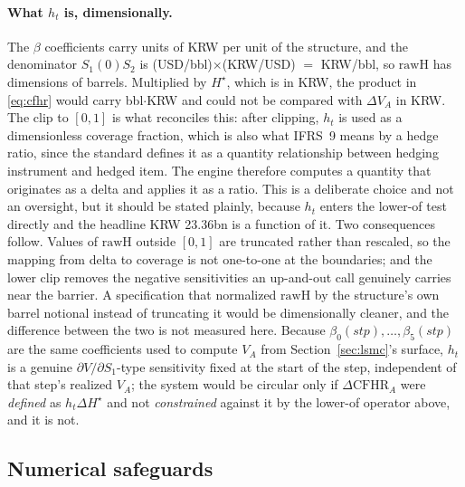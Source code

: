 \documentclass[11pt,a4paper]{article}
\begin{document}
\paragraph{What $h_t$ is, dimensionally.} The $\beta$ coefficients carry units of KRW per unit of the structure, and the denominator $S_1(0)S_2$ is (USD/bbl)$\times$(KRW/USD) $=$ KRW/bbl, so $\mathrm{rawH}$ has dimensions of barrels. Multiplied by $H^\star$, which is in KRW, the product in \eqref{eq:cfhr} would carry bbl$\cdot$KRW and could not be compared with $\Delta V_A$ in KRW. The clip to $[0,1]$ is what reconciles this: after clipping, $h_t$ is used as a dimensionless coverage fraction, which is also what IFRS~9 means by a hedge ratio, since the standard defines it as a quantity relationship between hedging instrument and hedged item. The engine therefore computes a quantity that originates as a delta and applies it as a ratio. This is a deliberate choice and not an oversight, but it should be stated plainly, because $h_t$ enters the lower-of test directly and the headline KRW 23.36bn is a function of it. Two consequences follow. Values of $\mathrm{rawH}$ outside $[0,1]$ are truncated rather than rescaled, so the mapping from delta to coverage is not one-to-one at the boundaries; and the lower clip removes the negative sensitivities an up-and-out call genuinely carries near the barrier. A specification that normalized $\mathrm{rawH}$ by the structure's own barrel notional instead of truncating it would be dimensionally cleaner, and the difference between the two is not measured here.
Because $\beta_0(stp),\ldots,\beta_5(stp)$ are the same coefficients used to compute $V_A$ from Section~\ref{sec:lsmc}'s surface, $h_t$ is a genuine $\partial V/\partial S_1$-type sensitivity fixed at the start of the step, independent of that step's realized $V_A$; the system would be circular only if $\Delta\mathrm{CFHR}_A$ were \emph{defined} as $h_t\Delta H^\star$ and not \emph{constrained} against it by the lower-of operator above, and it is not.

\subsection{Numerical safeguards}
\label{sec:safeguards}
\end{document}
